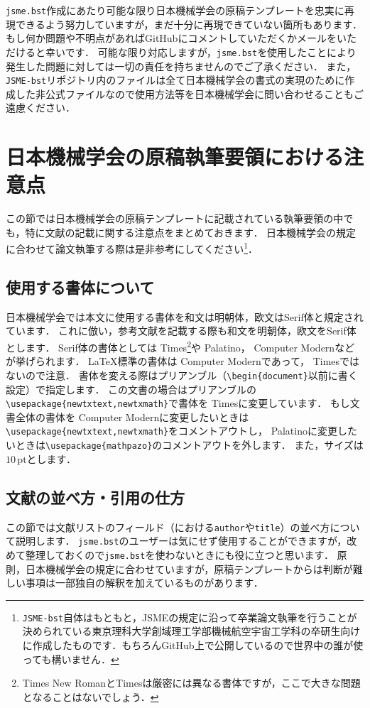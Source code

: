 \documentclass[a4paper,fleqn,uplatex,dvipdfmx]{jsarticle}
\newcommand{\jsmefile}{\texttt{jsme.bst}}
\newcommand{\JSMErepos}{\texttt{JSME-bst}}
\begin{document}
\jsmefile 作成にあたり可能な限り日本機械学会の原稿テンプレートを忠実に再現できるよう努力していますが，まだ十分に再現できていない箇所もあります．
もし何か問題や不明点があればGitHubにコメントしていただくかメールをいただけると幸いです．
可能な限り対応しますが，\jsmefile を使用したことにより発生した問題に対しては一切の責任を持ちませんのでご了承ください．
また，\JSMErepos リポジトリ内のファイルは全て日本機械学会の書式の実現のために作成した非公式ファイルなので使用方法等を日本機械学会に問い合わせることもご遠慮ください．


\section{日本機械学会の原稿執筆要領における注意点}
\label{sec:caution}
この節では日本機械学会の原稿テンプレートに記載されている執筆要領の中でも，特に文献の記載に関する注意点をまとめておきます．
日本機械学会の規定に合わせて論文執筆する際は是非参考にしてください\footnote{\JSMErepos 自体はもともと，JSMEの規定に沿って卒業論文執筆を行うことが決められている東京理科大学創域理工学部機械航空宇宙工学科の卒研生向けに作成したものです．もちろんGitHub上で公開しているので世界中の誰が使っても構いません．}．

\subsection{使用する書体について}
日本機械学会では本文に使用する書体を和文は明朝体，欧文はSerif体と規定されています．
これに倣い，参考文献を記載する際も和文を明朝体，欧文をSerif体とします．
Serif体の書体としては{ Times}\footnote{Times New RomanとTimesは厳密には異なる書体ですが，ここで大きな問題となることはないでしょう．}や{ Palatino}，{ Computer Modern}などが挙げられます．
\LaTeX{}標準の書体は{ Computer Modern}であって，{ Times}ではないので注意．
書体を変える際はプリアンブル（\verb|\begin{document}|以前に書く設定）で指定します．
この文書の場合はプリアンブルの\verb|\usepackage{newtxtext,newtxmath}|で書体を{ Times}に変更しています．
もし文書全体の書体を{ Computer Modern}に変更したいときは\verb|\usepackage{newtxtext,newtxmath}|をコメントアウトし，{ Palatino}に変更したいときは\verb|\usepackage{mathpazo}|のコメントアウトを外します．
また，サイズは$10\,\mathrm{pt}$とします．

\subsection{文献の並べ方・引用の仕方}
この節では文献リストのフィールド（\BibTeX{}における\verb|author|や\verb|title|）の並べ方について説明します．
\jsmefile のユーザーは気にせず使用することができますが，改めて整理しておくので\jsmefile を使わないときにも役に立つと思います．
原則，日本機械学会の規定に合わせていますが，原稿テンプレートからは判断が難しい事項は一部独自の解釈を加えているものがあります．
\end{document}
